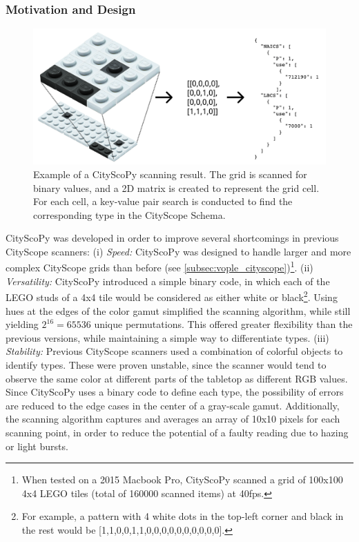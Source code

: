 {{      \subsubsection{Motivation and Design}
      {
          \begin{figure}[!htb]
              \begin{center}
                  \includegraphics[width=1\textwidth]{chapters/transformation/cs_arch/figures/cspy/cspy_3.png}
              \end{center}
              \caption{Example of a CityScoPy scanning result. The grid is scanned for binary values, and a 2D matrix is created to represent the grid cell. For each cell, a key-value pair search is conducted to find the corresponding type in the CityScope Schema.}
              \label{fig:cspy_results}
          \end{figure}

          CityScoPy was developed in order to improve several shortcomings in previous CityScope scanners: (i) \textit{Speed:} CityScoPy was designed to handle larger and more complex CityScope grids than before (see \eqref{subsec:vople_cityscope})\footnote{When tested on a 2015 Macbook Pro, CityScoPy scanned a grid of 100x100 4x4 LEGO tiles (total of 160000 scanned items) at 40fps.}. (ii) \textit{Versatility:} CityScoPy introduced a simple binary code, in which each of the LEGO studs of a 4x4 tile would be considered as either white or black\footnote{For example, a pattern with 4 white dots in the top-left corner and black in the rest would be [1,1,0,0,1,1,0,0,0,0,0,0,0,0,0,0].}. Using hues at the edges of the color gamut simplified the scanning algorithm, while still yielding $2^{16} = 65536$ unique permutations. This offered greater flexibility than the previous versions, while maintaining a simple way to differentiate types. (iii) \textit{Stability:} Previous CityScope scanners used a combination of colorful objects to identify types. These were proven unstable, since the scanner would tend to observe the same color at different parts of the tabletop as different RGB values. Since CityScoPy uses a binary code to define each type, the possibility of errors are reduced to the edge cases in the center of a gray-scale gamut. Additionally, the scanning algorithm captures and averages an array of 10x10 pixels for each scanning point, in order to reduce the potential of a faulty reading due to hazing or light bursts.
      }
}}

